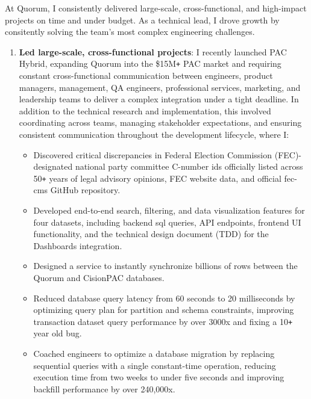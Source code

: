 \documentclass[]{article}
\def\Plus{\texttt{+}}
\begin{document}
At Quorum, I consistently delivered large-scale, cross-functional, and high-impact projects on time and under budget. As a  technical lead, I drove growth by consitently solving the team's most complex engineering challenges.


\begin{enumerate}
	\item \textbf{Led large-scale, cross-functional projects}: I recently launched PAC Hybrid, expanding Quorum into the \$15M{\Plus} PAC market and requiring constant cross-functional communication between engineers, product managers, management, QA engineers, professional services, marketing, and leadership teams to deliver a complex integration under a tight deadline. In addition to the technical research and implementation, this involved coordinating across teams, managing stakeholder expectations, and ensuring consistent communication throughout the development lifecycle, where I:

	\begin{itemize}
		\item Discovered critical discrepancies in Federal Election Commission (FEC)-designated national party committee C-number ids officially listed across 50{\Plus} years of legal advisory opinions, FEC website data, and official fec-cms GitHub repository.
		\item Developed end-to-end search, filtering, and data visualization features for four datasets, including backend sql queries, API endpoints, frontend UI functionality, and the technical design document (TDD) for the Dashboards integration.
		\item Designed a service to instantly synchronize billions of rows between the Quorum and CisionPAC databases.
		\item Reduced database query latency from 60 seconds to 20 milliseconds by optimizing query plan for partition and schema constraints, improving transaction dataset query performance by over 3000x and fixing a 10{\Plus} year old bug.
		\item Coached engineers to optimize a database migration by replacing sequential queries with a single constant-time operation, reducing execution time from two weeks to under five seconds and improving backfill performance by over 240,000x.
	\end{itemize}


\end{enumerate}
\end{document}
